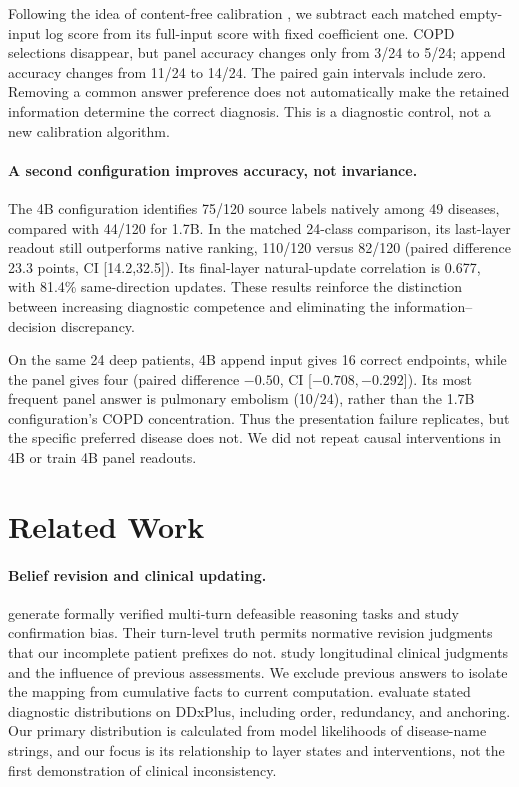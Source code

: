 \documentclass[11pt]{article}
\begin{document}
Following the idea of content-free calibration \citep{calibrate}, we subtract each matched empty-input log score from its full-input score with fixed coefficient one. COPD selections disappear, but panel accuracy changes only from 3/24 to 5/24; append accuracy changes from 11/24 to 14/24. The paired gain intervals include zero. Removing a common answer preference does not automatically make the retained information determine the correct diagnosis. This is a diagnostic control, not a new calibration algorithm.

\paragraph{A second configuration improves accuracy, not invariance.}
The 4B configuration identifies 75/120 source labels natively among 49 diseases, compared with 44/120 for 1.7B. In the matched 24-class comparison, its last-layer readout still outperforms native ranking, 110/120 versus 82/120 (paired difference 23.3 points, CI [14.2,32.5]). Its final-layer natural-update correlation is 0.677, with 81.4\% same-direction updates. These results reinforce the distinction between increasing diagnostic competence and eliminating the information--decision discrepancy.

On the same 24 deep patients, 4B append input gives 16 correct endpoints, while the panel gives four (paired difference $-0.50$, CI [$-0.708,-0.292$]). Its most frequent panel answer is pulmonary embolism (10/24), rather than the 1.7B configuration's COPD concentration. Thus the presentation failure replicates, but the specific preferred disease does not. We did not repeat causal interventions in 4B or train 4B panel readouts.

\section{Related Work}
\paragraph{Belief revision and clinical updating.}
\citet{derelab} generate formally verified multi-turn defeasible reasoning tasks and study confirmation bias. Their turn-level truth permits normative revision judgments that our incomplete patient prefixes do not. \citet{zeng2026} study longitudinal clinical judgments and the influence of previous assessments. We exclude previous answers to isolate the mapping from cumulative facts to current computation. \citet{arun2026} evaluate stated diagnostic distributions on DDxPlus, including order, redundancy, and anchoring. Our primary distribution is calculated from model likelihoods of disease-name strings, and our focus is its relationship to layer states and interventions, not the first demonstration of clinical inconsistency.
\end{document}
